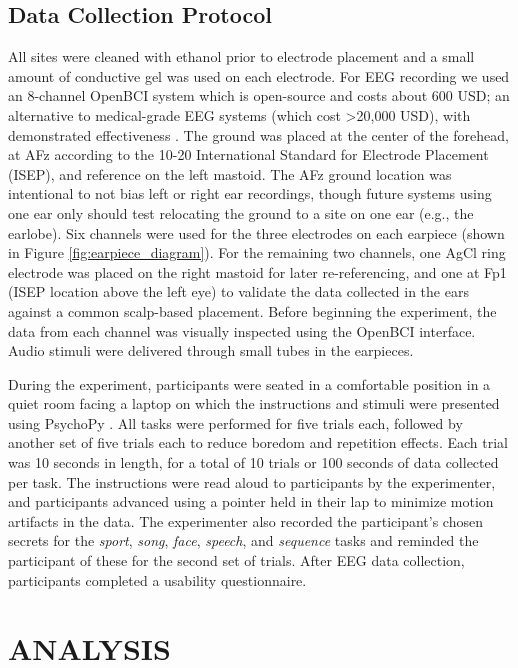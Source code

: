 \documentclass[a4paper,twoside]{article}
\begin{document}
\subsection{Data Collection Protocol}

\noindent All sites were cleaned with ethanol prior to electrode placement and a small amount of conductive gel was used on each electrode. For EEG recording we used an 8-channel OpenBCI system \cite{michalska2009openbci} which is open-source and costs about 600 USD; an alternative to medical-grade EEG systems (which cost \textgreater20,000 USD), with demonstrated effectiveness \cite{Frey2016}. The ground was placed at the center of the forehead, at AFz according to the 10-20 International Standard for Electrode Placement (ISEP), and reference on the left mastoid. The AFz ground location was intentional to not bias left or right ear recordings, though future systems using one ear only should test relocating the ground to a site on one ear (e.g., the earlobe). Six channels were used for the three electrodes on each earpiece (shown in Figure \ref{fig:earpiece_diagram}). For the remaining two channels, one AgCl ring electrode was placed on the right mastoid for later re-referencing, and one at Fp1 (ISEP location above the left eye) to validate the data collected in the ears against a common scalp-based placement. Before beginning the experiment, the data from each channel was visually inspected using the OpenBCI interface. Audio stimuli were delivered through small tubes in the earpieces.

During the experiment, participants were seated in a comfortable position in a quiet room facing a laptop on which the instructions and stimuli were presented using PsychoPy \cite{peirce2007psychopy}. All tasks were performed for five trials each, followed by another set of five trials each to reduce boredom and repetition effects. Each trial was 10 seconds in length, for a total of 10 trials or 100 seconds of data collected per task. The instructions were read aloud to participants by the experimenter, and participants advanced using a pointer held in their lap to minimize motion artifacts in the data. The experimenter also recorded the participant's chosen secrets for the \textit{sport}, \textit{song}, \textit{face}, \textit{speech}, and \textit{sequence} tasks and reminded the participant of these for the second set of trials. After EEG data collection, participants completed a usability questionnaire.

\section{\uppercase{Analysis}}
\label{sec:analysis}
\end{document}
